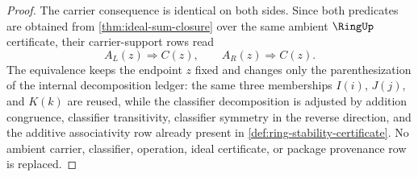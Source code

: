 \begin{proof}
The carrier consequence is identical on both sides. Since both predicates are obtained from \autoref{thm:ideal-sum-closure} over the same ambient $\RingUp$ certificate, their carrier-support rows read
$$
A_L(z)\Longrightarrow C(z),
\qquad
A_R(z)\Longrightarrow C(z).
$$
The equivalence keeps the endpoint $z$ fixed and changes only the parenthesization of the internal decomposition ledger: the same three memberships $I(i)$, $J(j)$, and $K(k)$ are reused, while the classifier decomposition is adjusted by addition congruence, classifier transitivity, classifier symmetry in the reverse direction, and the additive associativity row already present in \autoref{def:ring-stability-certificate}. No ambient carrier, classifier, operation, ideal certificate, or package provenance row is replaced.
\end{proof}
